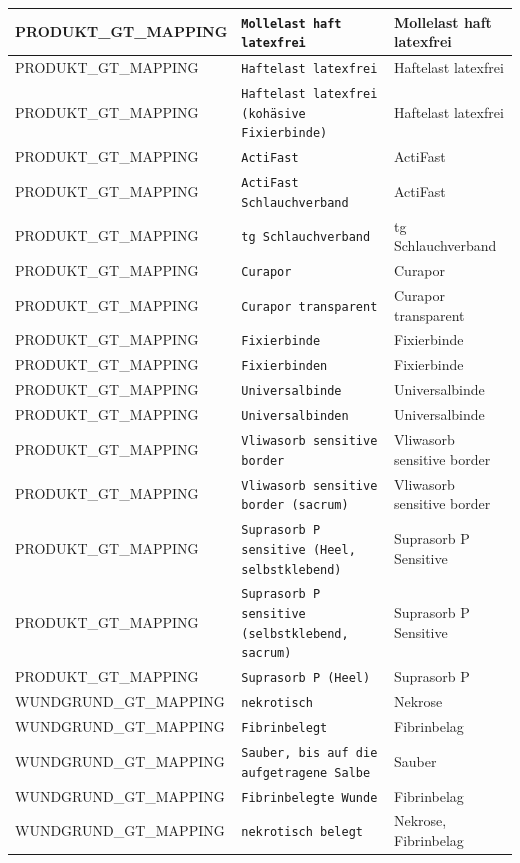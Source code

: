 \begin{longtable}{|p{3.5cm}|p{5cm}|p{6.5cm}|}
PRODUKT\_GT\_MAPPING & \texttt{Mollelast haft latexfrei} & Mollelast haft latexfrei \\ \hline
PRODUKT\_GT\_MAPPING & \texttt{Haftelast latexfrei} & Haftelast latexfrei \\ \hline
PRODUKT\_GT\_MAPPING & \texttt{Haftelast latexfrei (kohäsive Fixierbinde)} & Haftelast latexfrei \\ \hline
PRODUKT\_GT\_MAPPING & \texttt{ActiFast} & ActiFast \\ \hline
PRODUKT\_GT\_MAPPING & \texttt{ActiFast Schlauchverband} & ActiFast \\ \hline
PRODUKT\_GT\_MAPPING & \texttt{tg Schlauchverband} & tg Schlauchverband \\ \hline
PRODUKT\_GT\_MAPPING & \texttt{Curapor} & Curapor \\ \hline
PRODUKT\_GT\_MAPPING & \texttt{Curapor transparent} & Curapor transparent \\ \hline
PRODUKT\_GT\_MAPPING & \texttt{Fixierbinde} & Fixierbinde \\ \hline
PRODUKT\_GT\_MAPPING & \texttt{Fixierbinden} & Fixierbinde \\ \hline
PRODUKT\_GT\_MAPPING & \texttt{Universalbinde} & Universalbinde \\ \hline
PRODUKT\_GT\_MAPPING & \texttt{Universalbinden} & Universalbinde \\ \hline
PRODUKT\_GT\_MAPPING & \texttt{Vliwasorb sensitive border} & Vliwasorb sensitive border \\ \hline
PRODUKT\_GT\_MAPPING & \texttt{Vliwasorb sensitive border (sacrum)} & Vliwasorb sensitive border \\ \hline
PRODUKT\_GT\_MAPPING & \texttt{Suprasorb P sensitive (Heel, selbstklebend)} & Suprasorb P Sensitive \\ \hline
PRODUKT\_GT\_MAPPING & \texttt{Suprasorb P sensitive (selbstklebend, sacrum)} & Suprasorb P Sensitive \\ \hline
PRODUKT\_GT\_MAPPING & \texttt{Suprasorb P (Heel)} & Suprasorb P \\ \hline
WUNDGRUND\_GT\_MAPPING & \texttt{nekrotisch} & Nekrose \\ \hline
WUNDGRUND\_GT\_MAPPING & \texttt{Fibrinbelegt} & Fibrinbelag \\ \hline
WUNDGRUND\_GT\_MAPPING & \texttt{Sauber, bis auf die aufgetragene Salbe} & Sauber \\ \hline
WUNDGRUND\_GT\_MAPPING & \texttt{Fibrinbelegte Wunde} & Fibrinbelag \\ \hline
WUNDGRUND\_GT\_MAPPING & \texttt{nekrotisch belegt} & Nekrose, Fibrinbelag \\ \hline

\end{longtable}
